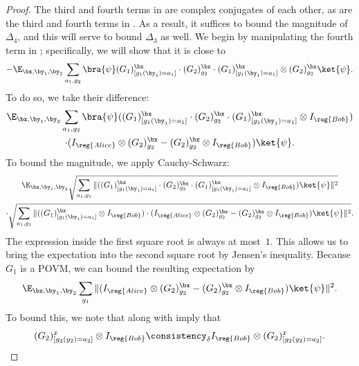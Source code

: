 \begin{proof}
The third and fourth terms in  are complex conjugates of each other,
as are the third and fourth terms in .
As a result, it suffices to bound the magnitude of $\Delta_4$, and this will serve to bound $\Delta_3$ as well.
We begin by manipulating the fourth term in ;
specifically, we will show that it is close to
\begin{equation}\label{eq:cloud}
-\E_{\bx, \by_1, \by_2} \sum_{a_1, g_2} \bra{\psi}
	 (G_1)^{\bx}_{[g_1(\by_1) = a_1]} \cdot (G_2)^{\bx}_{g_2} \cdot (G_1)^{\bx}_{[g_1(\by_1) = a_1]} \otimes (G_2)^{\bx}_{g_2} \ket{\psi}.
\end{equation}
To do so, we take their difference:
\begin{multline*}
\E_{\bx, \by_1, \by_2} \sum_{a_1, g_2} \bra{\psi}
	 ((G_1)^{\bx}_{[g_1(\by_1) = a_1]} \cdot (G_2)^{\bx}_{g_2} \cdot (G_1)^{\bx}_{[g_1(\by_1) = a_1]} \otimes I_{\reg{Bob}})\\
	\cdot (I_{\reg{Alice}} \otimes  (G_2)^{\bx}_{g_2} - (G_2)^{\bx}_{g_2} \otimes I_{\reg{Bob}}) \ket{\psi}.
\end{multline*}
To bound the magnitude, we apply Cauchy-Schwarz:
\begin{multline*}
\E_{\bx, \by_1, \by_2}
	\sqrt{\sum_{a_1, g_1} \Vert  ((G_1)^{\bx}_{[g_1(\by_1) = a_1]} \cdot (G_2)^{\bx}_{g_2} \cdot (G_1)^{\bx}_{[g_1(\by_1) = a_1]} \otimes I_{\reg{Bob}}) \ket{\psi} \Vert^2}\\
	\cdot \sqrt{\sum_{a_1, g_1} \Vert ((G_1)^{\bx}_{[g_1(\by_1) = a_1]} \otimes I_{\reg{Bob}})
	\cdot (I_{\reg{Alice}} \otimes  (G_2)^{\bx}_{g_2} - (G_2)^{\bx}_{g_2} \otimes I_{\reg{Bob}}) \ket{\psi} \Vert^2}.
\end{multline*}
The expression inside the first square root is always at most~$1$.
This allows us to bring the expectation into the second square root by Jensen's inequality.
Because $G_1$ is a POVM, we can bound the resulting expectation by
\begin{equation}\label{eq:majora}
\E_{\bx, \by_1, \by_2} \sum_{g_1} \Vert (I_{\reg{Alice}} \otimes  (G_2)^{\bx}_{g_2} - (G_2)^{\bx}_{g_2} \otimes I_{\reg{Bob}}) \ket{\psi} \Vert^2.
\end{equation}
To bound this, we note that  along with  imply that
\begin{equation*}
(G_2)^{x}_{[g_2(y_2) = a_2]} \otimes I_{\reg{Bob}}
\consistency_{\delta} I_{\reg{Bob}} \otimes (G_2)^{x}_{[g_2(y_2) = a_2]}.

\end{equation*}
\end{proof}
